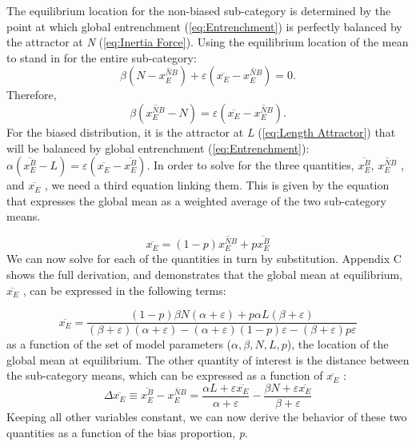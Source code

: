 The equilibrium location for the non-biased sub-category is determined
by the point at which global entrenchment (\ref{eq:Entrenchment})
is perfectly balanced by the attractor at \emph{N} (\ref{eq:Inertia Force}).
Using the equilibrium location of the mean to stand in for the entire
sub-category: \[\beta\left(N-\overline{x_{E}^{NB}}\right)+\varepsilon\left(\overline{x_{E}}-\overline{x_{E}^{NB}}\right)=0\text{.}\]
Therefore, \[\beta\left(\overline{x_{E}^{NB}}-N\right)=\varepsilon\left(\overline{x_{E}}-\overline{x_{E}^{NB}}\right)\text{.}\]
For the biased distribution, it is the attractor at \emph{L} (\ref{eq:Length Attractor})
that will be balanced by global entrenchment (\ref{eq:Entrenchment}):
$\alpha(\overline{x_{E}^{B}}-L)=\varepsilon(\overline{x_{E}}-\overline{x_{E}^{B}})$.
In order to solve for the three quantities, $\overline{x_{E}^{B}}$,
$\overline{x_{E}^{NB}}$ , and $\overline{x_{E}}$ , we need a third
equation linking them. This is given by the equation that expresses
the global mean as a weighted average of the two sub-category means.

\begin{equation}
\overline{x_{E}}=(1-p)\overline{x_{E}^{NB}}+p\overline{x_{E}^{B}}\label{eq:weighted mean}
\end{equation}
We can now solve for each of the quantities in turn by substitution.
Appendix C shows the full derivation, and demonstrates that the global
mean at equilibrium, $\overline{x_{E}}$ , can be expressed in the
following terms:

\begin{equation}
\overline{x_{E}}=\frac{(1-p)\beta N(\alpha+\varepsilon)+p\alpha L(\beta+\varepsilon)}{(\beta+\varepsilon)(\alpha+\varepsilon)-(\alpha+\varepsilon)(1-p)\varepsilon-(\beta+\varepsilon)p\varepsilon}\label{eq: sub-dist}
\end{equation}
as a function of the set of model parameters ($\alpha,\beta,N,L,p$),
the location of the global mean at equilibrium. The other quantity
of interest is the distance between the sub-category means, which
can be expressed as a function of $\overline{x_{E}}$ :
\begin{equation}
\Delta\overline{x_{E}}\equiv\overline{x_{E}^{B}}-\overline{x_{E}^{NB}}=\frac{\alpha L+\varepsilon\overline{x_{E}}}{\alpha+\varepsilon}-\frac{\beta N+\varepsilon\overline{x_{E}}}{\beta+\varepsilon}\label{eq:State Model-sep}
\end{equation}
Keeping all other variables constant, we can now derive the behavior
of these two quantities as a function of the bias proportion, \emph{p}. 

